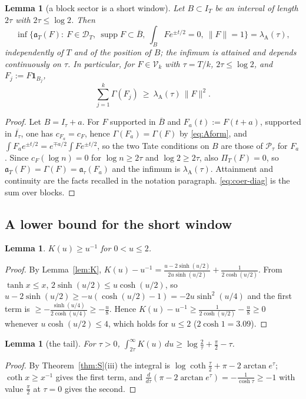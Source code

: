 \documentclass[11pt]{amsart}
\newtheorem{lemma}[theorem]{Lemma}
\theoremstyle{definition}
\theoremstyle{remark}
\newcommand{\supp}{\operatorname{supp}}
\newcommand{\IT}{I_T}
\newcommand{\cF}{c_F}
\newcommand{\PiT}{\Pi_T}
\begin{document}
\begin{lemma}[a block sector is a short window]\label{lem:coer-sector}
Let $B\subset\IT$ be an interval of length $2\tau$ with $2\tau\le\log2$. Then
\[
\inf\Big\{\mathfrak a_T(F):\ F\in\mathcal D_T,\ \supp F\subset\overline B,\ \int_BFe^{\pm t/2}=0,\ \|F\|=1\Big\}
=\lambda_{\mathrm A}(\tau),
\]
independently of $T$ and of the position of $B$; the infimum is attained and depends continuously on
$\tau$. In particular, for $F\in\mathcal V_k$ with $\tau=T/k$, $2\tau\le\log2$, and $F_j:=F\mathbf 1_{B_j}$,
\begin{equation}\label{eq:coer-diag}
\sum_{j=1}^k\Gamma(F_j)\ \ge\ \lambda_{\mathrm A}(\tau)\,\|F\|^2 .
\end{equation}
\end{lemma}
\begin{proof}
Let $B=I_\tau+a$. For $F$ supported in $\overline B$ and $F_a(t):=F(t+a)$, supported in $\overline{I_\tau}$,
one has $c_{F_a}=\cF$, hence $\Gamma(F_a)=\Gamma(F)$ by \eqref{eq:Aform}, and
$\int F_ae^{\pm t/2}=e^{\mp a/2}\int Fe^{\pm t/2}$, so the two Tate conditions on $B$ are those of
$\mathcal P_\tau$ for $F_a$. Since $\cF(\log n)=0$ for $\log n\ge2\tau$ and $\log2\ge2\tau$, also
$\PiT(F)=0$, so $\mathfrak a_T(F)=\Gamma(F)=\mathfrak a_\tau(F_a)$ and the infimum is
$\lambda_{\mathrm A}(\tau)$. Attainment and continuity are the facts recalled in the notation paragraph.
\eqref{eq:coer-diag} is the sum over blocks.
\end{proof}

\subsection{A lower bound for the short window}\label{subsec:coer-short}

\begin{lemma}\label{lem:coer-K}
$K(u)\ge u^{-1}$ for $0<u\le2$.
\end{lemma}
\begin{proof}
By Lemma~\ref{lem:K}, $K(u)-u^{-1}=\frac{u-2\sinh(u/2)}{2u\sinh(u/2)}+\frac1{2\cosh(u/2)}$. From
$\tanh x\le x$, $2\sinh(u/2)\le u\cosh(u/2)$, so $u-2\sinh(u/2)\ge-u(\cosh(u/2)-1)=-2u\sinh^2(u/4)$ and
the first term is $\ge-\frac{\sinh(u/4)}{2\cosh(u/4)}\ge-\frac u8$. Hence
$K(u)-u^{-1}\ge\frac1{2\cosh(u/2)}-\frac u8\ge0$ whenever $u\cosh(u/2)\le4$, which holds for $u\le2$
($2\cosh1=3.09$).
\end{proof}

\begin{lemma}[the tail]\label{lem:coer-tail}
For $\tau>0$, $\int_{2\tau}^\infty K(u)\,du\ge\log\frac2\tau+\frac\pi2-\tau$.
\end{lemma}
\begin{proof}
By Theorem~\ref{thm:S}(iii) the integral is $\log\coth\frac\tau2+\pi-2\arctan e^\tau$; $\coth x\ge x^{-1}$
gives the first term, and $\frac{d}{d\tau}(\pi-2\arctan e^\tau)=-\frac1{\cosh\tau}\ge-1$ with value
$\frac\pi2$ at $\tau=0$ gives the second.
\end{proof}
\end{document}
